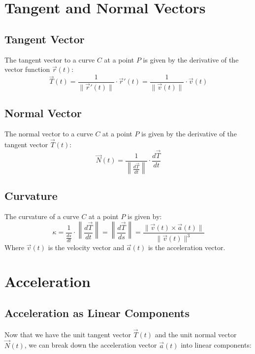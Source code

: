 \documentclass{article}
\begin{document}
\section{Tangent and Normal Vectors}
\subsection{Tangent Vector}
The tangent vector to a curve $C$ at a point $P$ is given by the derivative of the vector function $\vec{r}(t)$:
\begin{equation}
    \vec{T}(t) = \frac{1}{\lVert \vec{r}'(t) \rVert} \cdot \vec{r}'(t) = \frac{1}{\lVert \vec{v}(t) \rVert} \cdot \vec{v}(t)
\end{equation}


\subsection{Normal Vector}
The normal vector to a curve $C$ at a point $P$ is given by the derivative of the tangent vector $\vec{T}(t)$:
\begin{equation}
    \vec{N}(t) = \frac{1}{\left\lVert \frac{d\vec{T}}{dt} \right\rVert} \cdot \frac{d\vec{T}}{dt}
\end{equation}


\subsection{Curvature}
The curvature of a curve $C$ at a point $P$ is given by:
\begin{equation}
    \kappa = \frac{1}{\frac{ds}{dt}} \cdot \left\lVert \frac{d\vec{T}}{dt} \right\rVert = \left\lVert \frac{d\vec{T}}{ds} \right\rVert = \frac{\lVert \vec{v}(t) \times \vec{a}(t) \rVert}{\lVert \vec{v}(t) \rVert^3}
\end{equation}
Where $\vec{v}(t)$ is the velocity vector and $\vec{a}(t)$ is the acceleration vector.

\newpage

\section{Acceleration}

\subsection{Acceleration as Linear Components}

Now that we have the unit tangent vector $\vec{T}(t)$ and the unit normal vector $\vec{N}(t)$, we can break down the acceleration vector $\vec{a}(t)$ into linear components: \\
\end{document}
